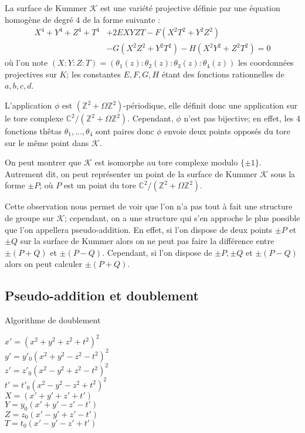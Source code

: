 \documentclass[a4paper,12pt]{article}
\theoremstyle{definition}
\theoremstyle{remark}
\numberwithin{equation}{section}
\begin{document}
La surface de Kummer $\mathcal{K}$ est une variété projective définie par une équation homogène de degré 4 de la forme suivante \citep{gaudry} :
\begin{align*}
X^4+Y^4+Z^4+T^4&+2EXYZT-F(X^2T^2+Y^2Z^2) \\
&-G(X^2Z^2+Y^2T^2)-H(X^2Y^2+Z^2T^2)=0
\end{align*}
où l'on note $(X:Y:Z:T)=(\theta_1(z):\theta_2(z):\theta_3(z):\theta_4(z))$ les coordonnées projectives sur $K$; les constantes $E,F,G,H$ étant des fonctions rationnelles de $a,b,c,d$.

L'application $\phi$ est $(\mathbb{Z}^2 + \Omega\mathbb{Z}^2)$-périodique, elle définit donc une application sur le tore complexe $\mathbb{C}^2/(\mathbb{Z}^2+\Omega\mathbb{Z}^2)$. Cependant, $\phi$ n'est pas bijective; en effet, les 4 fonctions thêtas $\theta_1,...,\theta_4$ sont paires donc $\phi$ envoie deux points opposés du tore sur le même point dans $\mathcal{K}$.

On peut montrer que $\mathcal{K}$ est isomorphe au tore complexe modulo $\{\pm 1\}$. Autrement dit, on peut représenter un point de la surface de Kummer $\mathcal{K}$ sous la forme $\pm P$; où $P$ est un point du tore $\mathbb{C}^2/(\mathbb{Z}^2+\Omega\mathbb{Z}^2)$.

Cette observation nous permet de voir que l'on n'a pas tout à fait une structure de groupe sur $\mathcal{K}$; cependant, on a une structure qui s'en approche le plus possible que l'on appellera pseudo-addition. En effet, si l'on dispose de deux points $\pm P$ et $\pm Q$ sur la surface de Kummer alors on ne peut pas faire la différence entre $\pm(P+Q)$ et $\pm(P-Q)$. Cependant, si l'on dispose de $\pm P,\pm Q$ et $\pm(P-Q)$ alors on peut calculer $\pm(P+Q)$.

\subsection{Pseudo-addition et doublement}

\begin{algorithm}
\label{DOUBLE}
\caption{Algorithme de doublement}
$x' = (x^2 + y^2 + z^2 + t^2)^2$ \\
$y' = y'_0(x^2 + y^2 - z^2 - t^2)^2$ \\
$z' = z'_0(x^2 - y^2 + z^2 - t^2)^2$ \\
$t' = t'_0(x^2 - y^2 - z^2 + t^2)^2$ \\
$X = (x' + y' + z' + t')$ \\
$Y = y_0(x' + y' - z' - t')$ \\
$Z = z_0(x' - y' + z' - t')$ \\
$T = t_0(x' - y' - z' + t')$ \\
\end{algorithm}
\end{document}
